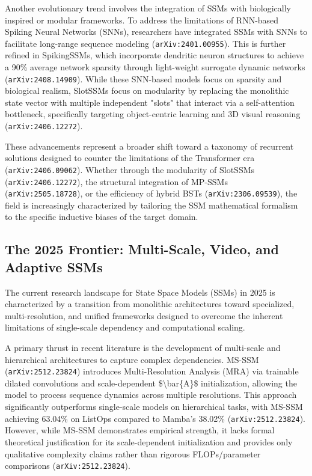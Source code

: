 \documentclass[11pt]{article}
\begin{document}
Another evolutionary trend involves the integration of SSMs with biologically inspired or modular frameworks. To address the limitations of RNN-based Spiking Neural Networks (SNNs), researchers have integrated SSMs with SNNs to facilitate long-range sequence modeling (\texttt{arXiv:2401.00955}). This is further refined in SpikingSSMs, which incorporate dendritic neuron structures to achieve a 90\% average network sparsity through light-weight surrogate dynamic networks (\texttt{arXiv:2408.14909}). While these SNN-based models focus on sparsity and biological realism, SlotSSMs focus on modularity by replacing the monolithic state vector with multiple independent "slots" that interact via a self-attention bottleneck, specifically targeting object-centric learning and 3D visual reasoning (\texttt{arXiv:2406.12272}).

These advancements represent a broader shift toward a taxonomy of recurrent solutions designed to counter the limitations of the Transformer era (\texttt{arXiv:2406.09062}). Whether through the modularity of SlotSSMs (\texttt{arXiv:2406.12272}), the structural integration of MP-SSMs (\texttt{arXiv:2505.18728}), or the efficiency of hybrid BSTs (\texttt{arXiv:2306.09539}), the field is increasingly characterized by tailoring the SSM mathematical formalism to the specific inductive biases of the target domain.

\subsection{The 2025 Frontier: Multi-Scale, Video, and Adaptive SSMs}

The current research landscape for State Space Models (SSMs) in 2025 is characterized by a transition from monolithic architectures toward specialized, multi-resolution, and unified frameworks designed to overcome the inherent limitations of single-scale dependency and computational scaling.

A primary thrust in recent literature is the development of multi-scale and hierarchical architectures to capture complex dependencies. MS-SSM (\texttt{arXiv:2512.23824}) introduces Multi-Resolution Analysis (MRA) via trainable dilated convolutions and scale-dependent \$\textbackslash{}bar\{A\}\$ initialization, allowing the model to process sequence dynamics across multiple resolutions. This approach significantly outperforms single-scale models on hierarchical tasks, with MS-SSM achieving 63.04\% on ListOps compared to Mamba's 38.02\% (\texttt{arXiv:2512.23824}). However, while MS-SSM demonstrates empirical strength, it lacks formal theoretical justification for its scale-dependent initialization and provides only qualitative complexity claims rather than rigorous FLOPs/parameter comparisons (\texttt{arXiv:2512.23824}).
\end{document}
